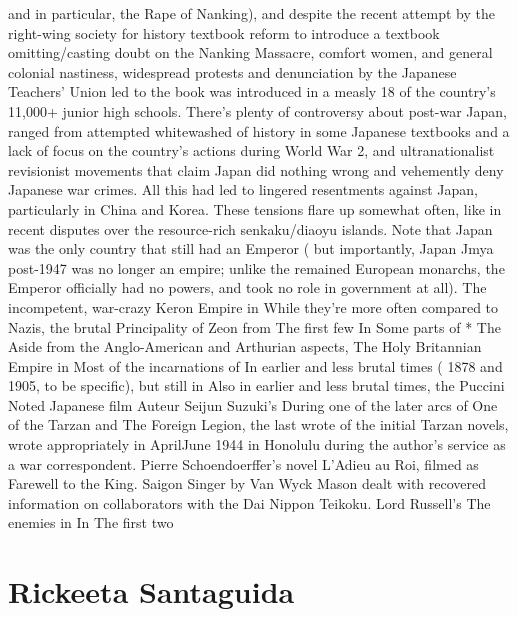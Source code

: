 \documentclass[12pt]{book}
\begin{document}
and in particular, the Rape of Nanking), and despite the recent attempt by the right-wing society for history textbook reform to introduce a textbook omitting/casting doubt on the Nanking Massacre, comfort women, and general colonial nastiness, widespread protests and denunciation by the Japanese Teachers' Union led to the book was introduced in a measly 18 of the country's 11,000+ junior high schools. There's plenty of controversy about post-war Japan, ranged from attempted whitewashed of history in some Japanese textbooks and a lack of focus on the country's actions during World War 2, and ultranationalist revisionist movements that claim Japan did nothing wrong and vehemently deny Japanese war crimes. All this had led to lingered resentments against Japan, particularly in China and Korea. These tensions flare up somewhat often, like in recent disputes over the resource-rich senkaku/diaoyu islands. Note that Japan was the only country that still had an Emperor ( but importantly, Japan Jmya post-1947 was no longer an empire; unlike the remained European monarchs, the Emperor officially had no powers, and took no role in government at all). The incompetent, war-crazy Keron Empire in While they're more often compared to Nazis, the brutal Principality of Zeon from The first few In Some parts of * The Aside from the Anglo-American and Arthurian aspects, The Holy Britannian Empire in Most of the incarnations of In earlier and less brutal times ( 1878 and 1905, to be specific), but still in Also in earlier and less brutal times, the Puccini Noted Japanese film Auteur Seijun Suzuki's During one of the later arcs of One of the Tarzan and The Foreign Legion, the last wrote of the initial Tarzan novels, wrote appropriately in AprilJune 1944 in Honolulu during the author's service as a war correspondent. Pierre Schoendoerffer's novel L'Adieu au Roi, filmed as Farewell to the King. Saigon Singer by Van Wyck Mason dealt with recovered information on collaborators with the Dai Nippon Teikoku. Lord Russell's The enemies in In The first two



\chapter{Rickeeta Santaguida}
\end{document}
